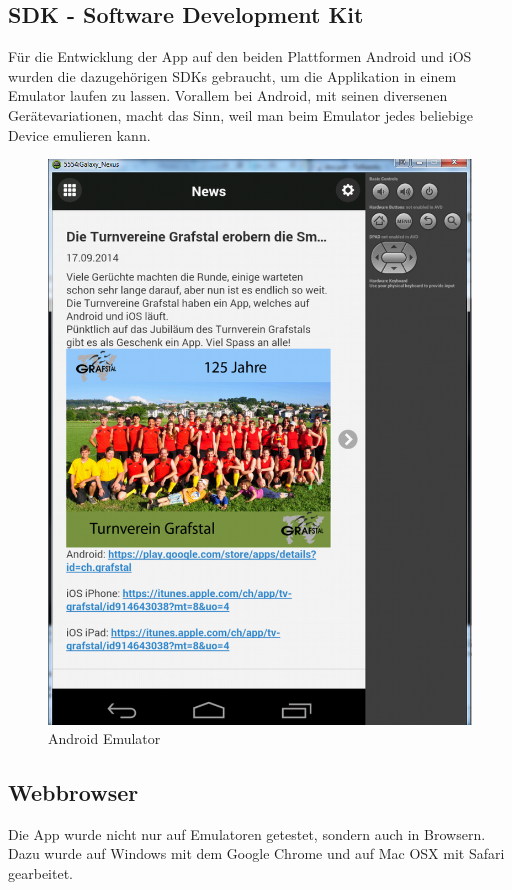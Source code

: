 \newpage
\subsection{SDK - Software Development Kit}
Für die Entwicklung der App auf den beiden Plattformen Android und iOS wurden die dazugehörigen SDKs gebraucht, um die Applikation in einem Emulator laufen zu lassen. Vorallem bei Android, mit seinen diversenen Gerätevariationen, macht das Sinn, weil man beim Emulator jedes beliebige Device emulieren kann.

\begin{figure}[h]
\centering
\includegraphics[scale=0.25]{images/android_emulator.png}
\caption{Android Emulator}
\label{fig:android_emulator}
\end{figure}

\FloatBarrier
\subsection{Webbrowser}
Die App wurde nicht nur auf Emulatoren getestet, sondern auch in Browsern. Dazu wurde auf Windows mit dem Google Chrome und auf Mac OSX mit Safari gearbeitet.

